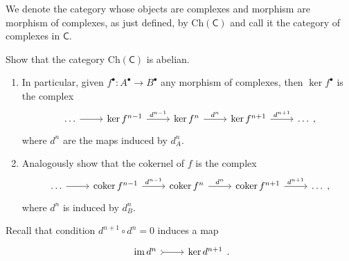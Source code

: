 \documentclass[../Main]{subfiles}
\begin{document}
\begin{defn}
	We denote the category whose objects are complexes and morphism
	are morphism of complexes, as just defined, by $\mathrm{Ch}(\mathsf{C})$
	and call it the category of complexes in $\mathsf{C}$.
\end{defn}

\begin{exr}
Show that the category $\mathrm{Ch}(\mathsf{C})$ is abelian.
\end{exr} 
\begin{exr}\leavevmode\vspace{-.2\baselineskip}
	\begin{enumerate}
		\item In particular, given $f^\bullet\colon A^\bullet \to B^\bullet$
			any morphism of complexes, then $\ker f^\bullet$ is the complex
			\begin{equation}
			\begin{tikzcd}
				\ldots \arrow[r, "", rightarrow] &
				\ker f^{n-1} \arrow[r, "d^{n-1}", rightarrow] &
				\ker f^n \arrow[r, "d^n", rightarrow] &
				\ker f^{n+1} \arrow[r, "d^{n+1}", rightarrow] &
				\ldots
			\end{tikzcd}
			,\end{equation} 
			where $d^n$ are the maps induced by $d^n_A$.
		\item Analogously show that the cokernel of $f$ is the complex
			\begin{equation}
			\begin{tikzcd}
				\ldots \arrow[r, "", rightarrow] &
				\coker f^{n-1} \arrow[r, "d^{n-1}", rightarrow] &
				\coker f^n \arrow[r, "d^n", rightarrow] &
				\coker f^{n+1} \arrow[r, "d^{n+1}", rightarrow] &
				\ldots
			\end{tikzcd}
			,\end{equation} 
			where $d^n$ is induced by $d^n_B$.
	\end{enumerate}
\end{exr} 

\begin{rem}[]
	Recall that condition $d^{n+1} \circ d^n = 0$ induces
	a map
	\begin{equation}
	\begin{tikzcd}
		\ima d^n \arrow[r, "", rightarrowtail] &
		\ker d^{n+1}
	\end{tikzcd}
	.\end{equation} 
\end{rem}
\end{document}
